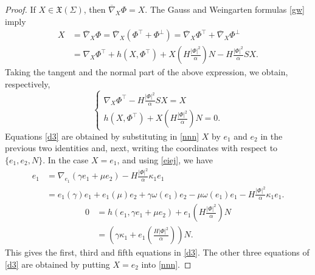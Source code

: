\documentclass[10pt,a4paper]{amsart}
\begin{document}
\begin{proof} 
 If $X\in\mathfrak{X}(\Sigma)$, then   $\overline{\nabla}_X\Phi=X$. The Gauss and
Weingarten formulas \eqref{gw} imply 
\begin{equation*}
\begin{split}
    X&=\overline{\nabla}_{X}\Phi=\overline{\nabla}_{X}(\Phi^{\top}+\Phi^{\perp})=\overline{\nabla}_{X} \Phi^{\top}+\overline{\nabla}_X\Phi^{\perp}\\
    &={\nabla}_{X}\Phi^{\top}+h(X,\Phi^{\top})+X( H\frac{|\Phi|^2}{\alpha})N- H\frac{|\Phi|^2}{\alpha} SX.
\end{split}
\end{equation*}
Taking the tangent and the normal part of the above expression, we obtain, respectively,
\begin{equation}\label{nnn} 
    \left\{
    \begin{array}{ll}
        {\nabla}_{X}\Phi^{\top}-H\frac{|\Phi|^2}{\alpha}SX=X\\
        h(X, \Phi^{\top})+X(H\frac{|\Phi|^2}{\alpha})N=0.
    \end{array}
    \right.
\end{equation}
Equations \eqref{d3} are obtained by substituting in \eqref{nnn} $X$ by $e_1$ and   $e_2$ in the previous two identities and, next, writing the  coordinates with respect to $\{e_1,e_2,N\}$. In the case $X=e_1$, and using \eqref{eiej}, we have
\begin{equation*} 
    \begin{array}{ll}
       e_1&=  {\nabla}_{e_1}(\gamma e_1+\mu e_2)-H\frac{|\Phi|^2}{\alpha}\kappa_1 e_1\\
     & =e_1(\gamma)e_1+e_1(\mu)e_2+\gamma \omega(e_1)e_2-\mu\omega(e_1)e_1-H\frac{|\Phi|^2}{\alpha}\kappa_1 e_1.
     \end{array}
\end{equation*}
\begin{equation*} 
    \begin{array}{ll}
       0&= h(e_1,\gamma e_1+\mu e_2)+e_1(H\frac{|\Phi|^2}{\alpha})N\\
       &=\left(\gamma\kappa_1+e_1\left(\frac{ H|\Phi|^2}{\alpha}\right)\right)N.
    \end{array}
\end{equation*}
This gives the first, third and fifth equations in \eqref{d3}. The other three equations of \eqref{d3} are obtained by putting $X=e_2$ into \eqref{nnn}.
\end{proof}
\end{document}
